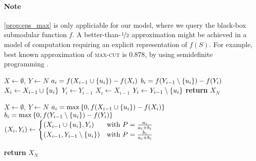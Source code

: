 \paragraph{Note} \cref{prop:eps_max} is only appliciable for our model, where we query the black-box submodular function $f$. A better-than-$\nicefrac{1}{2}$ approximation might be achieved in a model of computation requiring an explicit representation of $f(S)$. For example, best known approximation of \textsc{max-cut} is $0.878$, by using  semidefinite programming \cite{goemans1995improved}.

\begin{algorithm}
	\caption{}\label{alg:double_greedy}
	\begin{algorithmic}[1]
		\State $X \gets \emptyset$, $Y \gets N$
		\State $a_i = f(X_{i-1} \cup \qty{u_i})-f(X_i)$
		\State $b_i = f(Y_{i-1} \setminus \qty{u_i})-f(Y_i)$
		\State $X_i \gets X_{i-1} \cup \qty{u_i}$
		\State $Y_i \gets Y_{i-1}$
		\Else
		\State $X_i \gets X_{i-1}$
		\State $Y_i \gets Y_{i-1} \setminus \qty{u_i}$
		\EndIf
		\EndFor
		\State \textbf{return} $X_N$
		\EndProcedure
	\end{algorithmic}
\end{algorithm}


\begin{algorithm}
	\caption{}\label{alg:rand_double_greedy}
	\begin{algorithmic}[1]
		\State $X \gets \emptyset$, $Y \gets N$
		\State $a_i = \max \qty{0,f(X_{i-1} \cup \qty{u_i})-f(X_i)}$
		\State $b_i = \max \qty{0,f(Y_{i-1} \setminus \qty{u_i})-f(Y_i)}$
		\State $(X_i,Y_i) \gets\begin{cases}
		\qty(X_{i-1} \cup \qty{u_i}, Y_i) & \text{with } P= \frac{a_i}{a_i+b_i} \\
		\qty(X_{i-1} ,Y_{i-1} \setminus \qty{u_i}) & \text{with } P= \frac{b_i}{a_i+b_i} 
		\end{cases}$
		
		\EndFor
		\State \textbf{return} $X_N$
		\EndProcedure
	\end{algorithmic}
\end{algorithm}